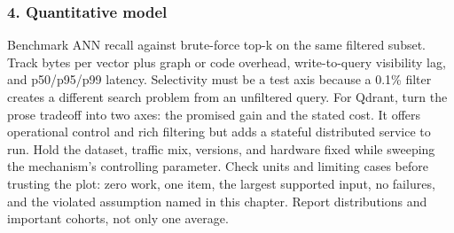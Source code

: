 \subsubsection*{4. Quantitative model}
Benchmark ANN recall against brute-force top-k on the same filtered subset. Track bytes per vector plus graph or code overhead, write-to-query visibility lag, and p50/p95/p99 latency. Selectivity must be a test axis because a 0.1\% filter creates a different search problem from an unfiltered query.
For Qdrant, turn the prose tradeoff into two axes: the promised gain and the stated cost. It offers operational control and rich filtering but adds a stateful distributed service to run. Hold the dataset, traffic mix, versions, and hardware fixed while sweeping the mechanism's controlling parameter.
Check units and limiting cases before trusting the plot: zero work, one item, the largest supported input, no failures, and the violated assumption named in this chapter. Report distributions and important cohorts, not only one average.
